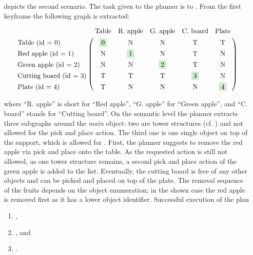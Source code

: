  depicts the second scenario. 
The task given to the planner is to . 
From the first keyframe the following graph is extracted:

\begin{align*}
  \bordermatrix{
                                    & \textup{Table}        & \textup{R. apple}     & \textup{G. apple}     & \textup{C. board}& \textup{Plate}\cr
    \textup{Table (id = 0)}         & \colorbox{green120}{0}& \textup{N}            & \textup{N}            & \textup{T}            & \textup{T}\cr
    \textup{Red apple (id = 1)}     & \textup{N}            & \colorbox{green120}{1}& \textup{N}            & \textup{T}            & \textup{N}\cr
    \textup{Green apple (id = 2)}   & \textup{N}            & \textup{N}            & \colorbox{green120}{2}& \textup{T}            & \textup{N}\cr
    \textup{Cutting board (id = 3)} & \textup{T}            & \textup{T}            & \textup{T}            & \colorbox{green120}{3}& \textup{N}\cr
    \textup{Plate (id = 4)}         & \textup{T}            & \textup{N}            & \textup{N}            & \textup{N}            & \colorbox{green120}{4}\cr
    }
\end{align*}

where ``R. apple'' is short for ``Red apple'', ``G. apple'' for ``Green apple'', and ``C. board'' stands for ``Cutting board''.
On the semantic level the planner extracts three subgraphs around the \emph{main} object: two are tower structures (cf. ) and not allowed for the pick and place action.
The third one is one single object on top of the support, which is allowed for .
First, the planner suggests to remove the red apple via pick and place onto the table.
As the requested action is still not allowed, as one tower structure remains, a second pick and place action of the green apple is added to the list.
Eventually, the cutting board is free of any other objects and can be picked and placed on top of the plate.
The removal sequence of the fruits depends on the object enumeration; in the shown case the red apple is removed first as it has a lower object identifier. 
Successful execution of the plan

\begin{enumerate}
  \item {},
  \item {}, and
  \item {}.
\end{enumerate}

